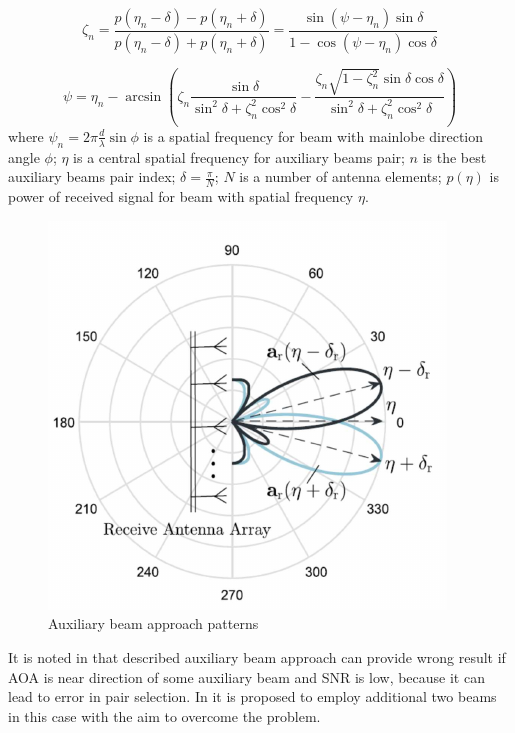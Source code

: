 \begin{equation}
    \label{eq:}
    \zeta_n = \frac{p(\eta_n - \delta) - p(\eta_n + \delta)}{p(\eta_n - \delta)
    + p(\eta_n + \delta)} = 
    \frac{\sin(\psi - \eta_n)\sin\delta}{1 - \cos(\psi - \eta_n)\cos \delta}
\end{equation}

\begin{equation}
    \label{eq:}
    \psi = \eta_n - \arcsin( 
    \zeta_n \frac{\sin\delta}{\sin^2 \delta + \zeta^2_n \cos^2\delta}
    -
    \frac{\zeta_n \sqrt{1-\zeta^2_n} \sin \delta \cos \delta}{\sin^2\delta +
    \zeta^2_n \cos^2 \delta}
    )
\end{equation}
where $\psi_n = 2\pi \frac{d}{\lambda} \sin \phi$ is a spatial frequency for
beam with mainlobe direction angle $\phi$; $\eta$ is a central spatial
frequency for auxiliary beams pair; $n$ is the best auxiliary beams pair index;
$\delta = \frac{\pi}{N}$; $N$ is a number of antenna elements; $p(\eta)$ is
power of received signal for beam with spatial frequency $\eta$.

\begin{figure}[h]
    \centering
    \includegraphics[width=0.6\linewidth]{figs/fig3.13}
    \caption{Auxiliary beam approach patterns \cite{Zhu2016}}
    \label{fig:}
\end{figure}

It is noted in \cite{Sherman2011} that described auxiliary beam approach can provide wrong
result if AOA is near direction of some auxiliary beam and SNR is low, because
it can lead to error in pair selection. In \cite{Sherman2011} it is proposed to employ
additional two beams in this case with the aim to overcome the problem.

